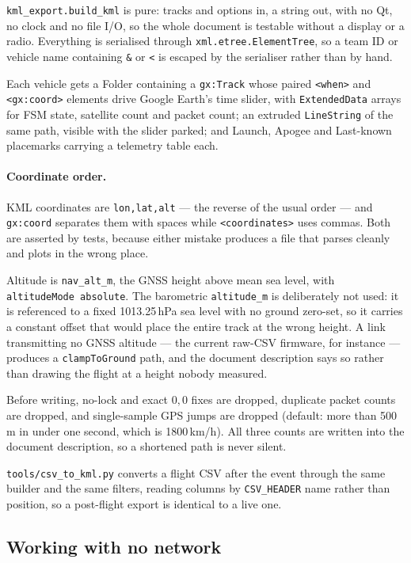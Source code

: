 \documentclass[11pt,a4paper]{article}
\begin{document}
\texttt{kml\_export.build\_kml} is pure: tracks and options in, a string out,
with no Qt, no clock and no file I/O, so the whole document is testable
without a display or a radio. Everything is serialised through
\texttt{xml.etree.ElementTree}, so a team ID or vehicle name containing
\texttt{\&} or \texttt{<} is escaped by the serialiser rather than by hand.

Each vehicle gets a Folder containing a \texttt{gx:Track} whose paired
\texttt{<when>} and \texttt{<gx:coord>} elements drive Google Earth's time
slider, with \texttt{ExtendedData} arrays for FSM state, satellite count and
packet count; an extruded \texttt{LineString} of the same path, visible with
the slider parked; and Launch, Apogee and Last-known placemarks carrying a
telemetry table each.

\paragraph{Coordinate order.}
KML coordinates are \texttt{lon,lat,alt} --- the reverse of the usual
order --- and \texttt{gx:coord} separates them with spaces while
\texttt{<coordinates>} uses commas. Both are asserted by tests, because
either mistake produces a file that parses cleanly and plots in the wrong
place.

Altitude is \texttt{nav\_alt\_m}, the GNSS height above mean sea level, with
\texttt{altitudeMode absolute}. The barometric \texttt{altitude\_m} is
deliberately not used: it is referenced to a fixed 1013.25\,hPa sea level
with no ground zero-set, so it carries a constant offset that would place the
entire track at the wrong height. A link transmitting no GNSS altitude ---
the current raw-CSV firmware, for instance --- produces a
\texttt{clampToGround} path, and the document description says so rather than
drawing the flight at a height nobody measured.

Before writing, no-lock and exact $0,0$ fixes are dropped, duplicate packet
counts are dropped, and single-sample GPS jumps are dropped (default: more
than 500\,m in under one second, which is 1800\,km/h). All three counts are
written into the document description, so a shortened path is never silent.

\texttt{tools/csv\_to\_kml.py} converts a flight CSV after the event through
the same builder and the same filters, reading columns by
\texttt{CSV\_HEADER} name rather than position, so a post-flight export is
identical to a live one.

\subsection{Working with no network}
\label{sec:map-offline}
\end{document}
